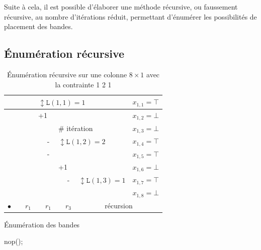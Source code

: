 \documentclass[a4paper,12pt]{report}
\newcommand\black{\cellcolor{black}}
\newcommand\grey{\cellcolor{black!50}}
\begin{document}
Suite à cela, il est possible d'élaborer une méthode récursive, ou faussement récursive, au nombre d'itérations réduit, permettant d'énumérer les possibilités de placement des bandes.

\subsection{Énumération récursive}
\begin{table}[H]
\centering
\begin{tabular}{|c|c|c|l|c|l|c|c|c|}
\hline 
\grey &&\black & \multicolumn{5}{l|}{$\updownarrow \mathtt{L}(1,1) = 1$}& $x_{1,1}=\top$ \\ 
\hline 
\grey && & \multicolumn{5}{l|}{+1} & $x_{1,2}=\bot$ \\ 
\hline
\grey &&\grey &  &  & \multicolumn{3}{l|}{$\#$ itération}& $x_{1,3}=\bot$ \\ 
\hline 
\grey &&\grey &  & \black - & \multicolumn{3}{l|}{$\updownarrow \mathtt{L}(1,2) = 2$}& $x_{1,4}=\top$ \\ 
\cline{1-5}\cline{9-9}
\grey &&\grey &  & \black - & \multicolumn{3}{l|}{}& $x_{1,5}=\top$\\ 
\hline 
\grey &&\grey &  &  & \multicolumn{3}{l|}{+1} & $x_{1,6}=\bot$\\ 
\hline 
\grey &&\grey &  & \grey &  & \black - & $\updownarrow \mathtt{L}(1,3) = 1$ & $x_{1,7}=\top$ \\ 
\hline 
\grey &&\grey &  & \grey &  &  &  & $x_{1,8}=\bot$\\ 
\hline
\hline 
 $\bullet$&&$r_1$ &  & $r_1$ &  &$r_3$&  \multicolumn{2}{c|}{récursion}\\
\hline
\end{tabular}
\caption{\label{EnumBande} Énumération récursive sur une colonne $8\times1$ avec la contrainte 1 2 1}
\end{table}

 
\begin{algorithm}
\caption{Énumération des bandes}
\begin{algorithmic}
		nop();		
		\EndFor			
\EndFor
\end{algorithmic}
\end{algorithm}

	
						
\end{document}
